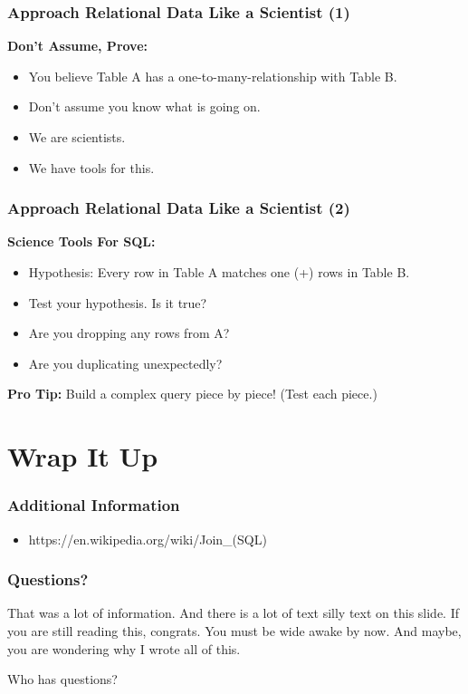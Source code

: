 \documentclass{beamer}
\begin{document}
\begin{frame}
  \frametitle{Approach Relational Data Like a Scientist (1)}
  
  \textbf{Don't Assume, Prove:}
  \begin{itemize}
  \item You believe Table A has a one-to-many-relationship with Table
    B.
  \item Don't assume you know what is going on.
  \item We are scientists. 
  \item We have tools for this.
  \end{itemize}

\end{frame}

\begin{frame}
  \frametitle{Approach Relational Data Like a Scientist (2)}
    
  \textbf{Science Tools For SQL:}
  \begin{itemize}
  \item Hypothesis: Every row in Table A matches one (+) rows in
    Table B.
  \item Test your hypothesis. Is it true?
  \item Are you dropping any rows from A?
  \item Are you duplicating unexpectedly?
  \end{itemize}

  \bigskip
  \textbf{Pro Tip: }Build a complex query piece by piece! (Test each piece.)
\end{frame}
\section{ Wrap It Up} %

\begin{frame}
  \frametitle{Additional Information}
  \begin{itemize}
  \item https://en.wikipedia.org/wiki/Join\_(SQL)
  \end{itemize}
\end{frame}

\begin{frame}
  \frametitle{Questions?}

  \begin{center}
    {\large That was a lot of information. And there is a lot of text
      silly text on this slide. If you are still reading this,
      congrats. You must be wide awake by now. And maybe, you are
      wondering why I wrote all of this.}

    \bigskip
    {\huge  Who has questions?}
  \end{center}

\end{frame}
\end{document}
